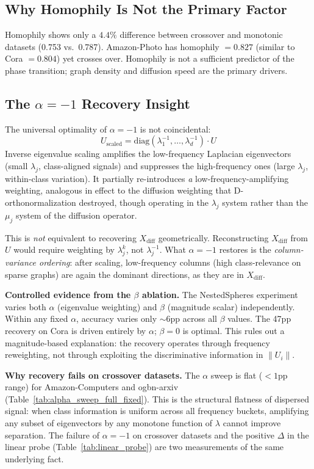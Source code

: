 \documentclass[11pt]{article}
\begin{document}
\subsection{Why Homophily Is Not the Primary Factor}

Homophily shows only a $4.4\%$ difference between crossover and monotonic datasets
(0.753 vs.\ 0.787).  Amazon-Photo has homophily $= 0.827$ (similar to Cora $= 0.804$)
yet crosses over.  Homophily is not a sufficient predictor of the phase transition;
graph density and diffusion speed are the primary drivers.

\subsection{The $\alpha = -1$ Recovery Insight}

The universal optimality of $\alpha{=}-1$ is not coincidental:
\[
U_{\text{scaled}} = \mathrm{diag}(\lambda_1^{-1}, \ldots, \lambda_{d}^{-1}) \cdot U
\]
Inverse eigenvalue scaling amplifies the low-frequency Laplacian eigenvectors
(small $\lambda_j$, class-aligned signals) and suppresses the high-frequency ones
(large $\lambda_j$, within-class variation).  It partially re-introduces
\emph{a} low-frequency-amplifying weighting, analogous in effect to the
diffusion weighting that D-orthonormalization destroyed, though operating in
the $\lambda_j$ system rather than the $\mu_j$ system of the diffusion operator.

This is \emph{not} equivalent to recovering $X_{\mathrm{diff}}$ geometrically.
Reconstructing $X_{\mathrm{diff}}$ from $U$ would require weighting by $\lambda_j^k$,
not $\lambda_j^{-1}$.  What $\alpha{=}-1$ restores is the \emph{column-variance
ordering}: after scaling, low-frequency columns (high class-relevance on sparse graphs)
are again the dominant directions, as they are in $X_{\mathrm{diff}}$.

\noindent\textbf{Controlled evidence from the $\beta$ ablation.}
The NestedSpheres experiment varies both $\alpha$ (eigenvalue weighting) and $\beta$
(magnitude scalar) independently.  Within any fixed $\alpha$, accuracy varies
only ${\sim}6$pp across all $\beta$ values.  The 47pp recovery on Cora is driven
entirely by $\alpha$; $\beta{=}0$ is optimal.  This rules out a magnitude-based
explanation: the recovery operates through frequency reweighting, not through
exploiting the discriminative information in $\|U_i\|$.

\noindent\textbf{Why recovery fails on crossover datasets.}
The $\alpha$ sweep is flat ($<1$pp range) for Amazon-Computers and ogbn-arxiv
(Table~\ref{tab:alpha_sweep_full_fixed}).  This is the structural flatness of
dispersed signal: when class information is uniform across all frequency buckets,
amplifying any subset of eigenvectors by any monotone function of $\lambda$ cannot
improve separation.  The failure of $\alpha{=}-1$ on crossover datasets and the
positive $\Delta$ in the linear probe (Table~\ref{tab:linear_probe}) are two
measurements of the same underlying fact.
\end{document}
